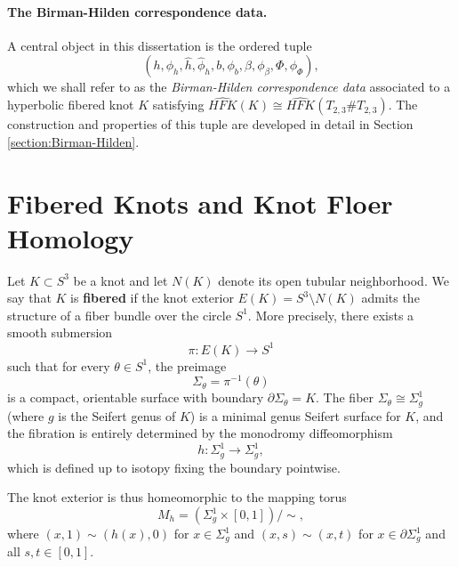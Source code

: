 \paragraph{The Birman-Hilden correspondence data.} A central object in this dissertation is the ordered tuple
\[
(h, \phi_h, \hat{h}, \hat{\phi}_h, b, \phi_b, \beta, \phi_\beta, \Phi, \phi_\Phi),
\]
which we shall refer to as the \emph{Birman-Hilden correspondence data} associated to a hyperbolic fibered knot $K$ satisfying $\widehat{HFK}(K) \cong \widehat{HFK}(T_{2,3}\# T_{2,3})$. The construction and properties of this tuple are developed in detail in Section \ref{section:Birman-Hilden}.

\section{Fibered Knots and Knot Floer Homology}
\label{sec:fibered-hfk}

Let $K \subset S^3$ be a knot and let $N(K)$ denote its open tubular neighborhood. We say that $K$ is \textbf{fibered} if the knot exterior $E(K) = S^3 \setminus N(K)$ admits the structure of a fiber bundle over the circle $S^1$. More precisely, there exists a smooth submersion
\[
\pi: E(K) \to S^1
\]
such that for every $\theta \in S^1$, the preimage
\[
\Sigma_\theta = \pi^{-1}(\theta)
\]
is a compact, orientable surface with boundary $\partial \Sigma_\theta = K$. The fiber $\Sigma_\theta \cong \Sigma_g^1$ (where $g$ is the Seifert genus of $K$) is a minimal genus Seifert surface for $K$, and the fibration is entirely determined by the monodromy diffeomorphism
\[
h: \Sigma_g^1 \to \Sigma_g^1,
\]
which is defined up to isotopy fixing the boundary pointwise.

The knot exterior is thus homeomorphic to the mapping torus
\[
M_h = (\Sigma_g^1 \times [0,1]) / \sim,
\]
where $(x, 1) \sim (h(x), 0)$ for $x \in \Sigma_g^1$ and $(x, s) \sim (x, t)$ for $x \in \partial \Sigma_g^1$ and all $s,t \in [0,1]$.

